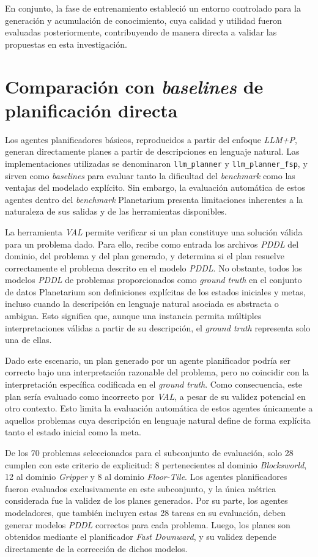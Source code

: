 En conjunto, la fase de entrenamiento estableció un entorno controlado para la generación y acumulación de conocimiento, cuya calidad y utilidad fueron evaluadas posteriormente, contribuyendo de manera directa a validar las propuestas en esta investigación.

\section{Comparación con \textit{baselines} de planificación directa}

Los agentes planificadores básicos, reproducidos a partir del enfoque \textit{LLM+P}, generan directamente planes a partir de descripciones en lenguaje natural. Las implementaciones utilizadas se denominaron \texttt{llm\_planner} y \texttt{llm\_planner\_fsp}, y sirven como \textit{baselines} para evaluar tanto la dificultad del \textit{benchmark} como las ventajas del modelado explícito. Sin embargo, la evaluación automática de estos agentes dentro del \textit{benchmark} Planetarium presenta limitaciones inherentes a la naturaleza de sus salidas y de las herramientas disponibles.

La herramienta \textit{VAL} permite verificar si un plan constituye una solución válida para un problema dado. Para ello, recibe como entrada los archivos \textit{PDDL} del dominio, del problema y del plan generado, y determina si el plan resuelve correctamente el problema descrito en el modelo \textit{PDDL}. No obstante, todos los modelos \textit{PDDL} de problemas proporcionados como \textit{ground truth} en el conjunto de datos Planetarium son definiciones explícitas de los estados iniciales y metas, incluso cuando la descripción en lenguaje natural asociada es abstracta o ambigua. Esto significa que, aunque una instancia permita múltiples interpretaciones válidas a partir de su descripción, el \textit{ground truth} representa solo una de ellas.

Dado este escenario, un plan generado por un agente planificador podría ser correcto bajo una interpretación razonable del problema, pero no coincidir con la interpretación específica codificada en el \textit{ground truth}. Como consecuencia, este plan sería evaluado como incorrecto por \textit{VAL}, a pesar de su validez potencial en otro contexto. Esto limita la evaluación automática de estos agentes únicamente a aquellos problemas cuya descripción en lenguaje natural define de forma explícita tanto el estado inicial como la meta.

De los 70 problemas seleccionados para el subconjunto de evaluación, solo 28 cumplen con este criterio de explicitud: 8 pertenecientes al dominio \textit{Blocksworld}, 12 al dominio \textit{Gripper} y 8 al dominio \textit{Floor-Tile}. Los agentes planificadores fueron evaluados exclusivamente en este subconjunto, y la única métrica considerada fue la validez de los planes generados. Por su parte, los agentes modeladores, que también incluyen estas 28 tareas en su evaluación, deben generar modelos \textit{PDDL} correctos para cada problema. Luego, los planes son obtenidos mediante el planificador \textit{Fast Downward}, y su validez depende directamente de la corrección de dichos modelos.

